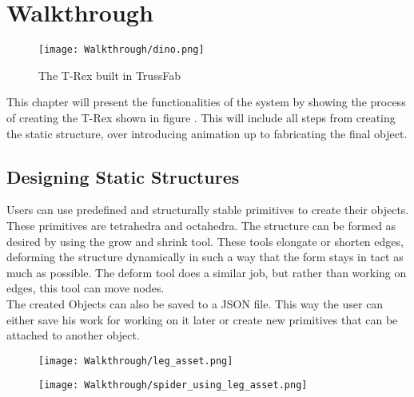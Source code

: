 \chapter{Walkthrough}\label{ch:walkthrough}
\begin{figure}[h!]
    \texttt{[image: Walkthrough/dino.png]}
    \centering
    \caption{The T-Rex built in TrussFab}
    \label{fig:t_rex}
\end{figure}
This chapter will present the functionalities of the system by showing the process of creating the T-Rex shown in figure . This will include all steps from creating the static structure, over introducing animation up to fabricating the final object.

\section{Designing Static Structures}
Users can use predefined and structurally stable primitives to create their objects. These primitives are tetrahedra and octahedra. The structure can be formed as desired by using the grow and shrink tool. These tools elongate or shorten edges, deforming the structure dynamically in such a way that the form stays in tact as much as possible. The deform tool does a similar job, but rather than working on edges, this tool can move nodes.\\
The created Objects can also be saved to a JSON file. This way the user can either save his work for working on it later or create new primitives that can be attached to another object.
\begin{figure}
  \centering
  \begin{minipage}{.5\textwidth}
    \centering
    \texttt{[image: Walkthrough/leg\_asset.png]}
    \label{fig:leg_asset}
  \end{minipage}%
  \begin{minipage}{.5\textwidth}
    \centering
    \texttt{[image: Walkthrough/spider\_using\_leg\_asset.png]}
    \label{fig:spider_in_progress}
  \end{minipage}
\end{figure}

